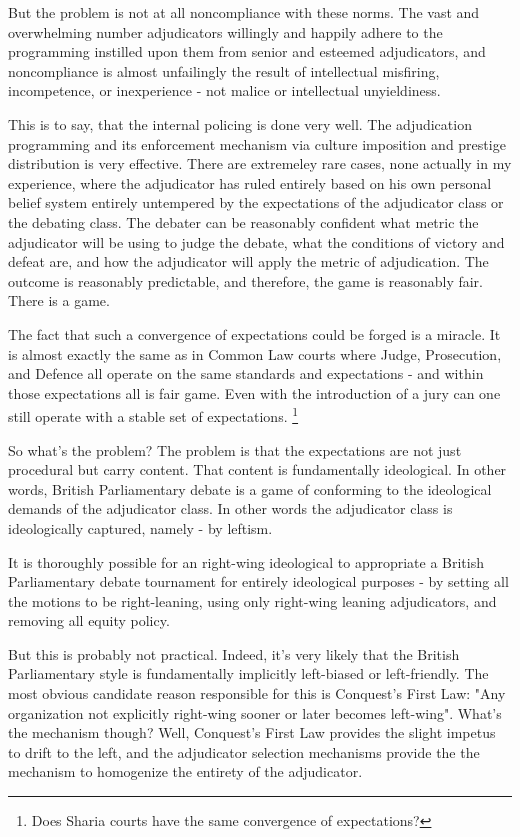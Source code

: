 \begin{itemize}
    But the problem is not at all noncompliance with these norms. The vast and overwhelming number adjudicators willingly and happily adhere to the programming instilled upon them from senior and esteemed adjudicators, and noncompliance is almost unfailingly the result of intellectual misfiring, incompetence, or inexperience - not malice or intellectual unyieldiness.

    This is to say, that the internal policing is done very well. The adjudication programming and its enforcement mechanism via culture imposition and prestige distribution is very effective. There are extremeley rare cases, none actually in my experience, where the adjudicator has ruled entirely based on his own personal belief system entirely untempered by the expectations of the adjudicator class or the debating class. The debater can be reasonably confident what metric the adjudicator will be using to judge the debate, what the conditions of victory and defeat are, and how the adjudicator will apply the metric of adjudication. The outcome is reasonably predictable, and therefore, the game is reasonably fair. There is a game. 

    The fact that such a convergence of expectations could be forged is a miracle. It is almost exactly the same as in Common Law courts where Judge, Prosecution, and Defence all operate on the same standards and expectations - and within those expectations all is fair game. Even with the introduction of a jury can one still operate with a stable set of expectations. 
    \footnote{Does Sharia courts have the same convergence of expectations?}
    
    So what's the problem? The problem is that the expectations are not just procedural but carry content. That content is fundamentally ideological. In other words, British Parliamentary debate is a game of conforming to the ideological demands of the adjudicator class. In other words the adjudicator class is ideologically captured, namely - by leftism. 

    It is thoroughly possible for an right-wing ideological to appropriate a British Parliamentary debate tournament for entirely ideological purposes - by setting all the motions to be right-leaning, using only right-wing leaning adjudicators, and removing all equity policy. 
    
    But this is probably not practical. Indeed, it's very likely that the British Parliamentary style is fundamentally implicitly left-biased or left-friendly. The most obvious candidate reason responsible for this is Conquest's First Law: "Any organization not explicitly right-wing sooner or later becomes left-wing". What's the mechanism though? Well, Conquest's First Law provides the slight impetus to drift to the left, and the adjudicator selection mechanisms provide the the mechanism to homogenize the entirety of the adjudicator.


\end{itemize}
